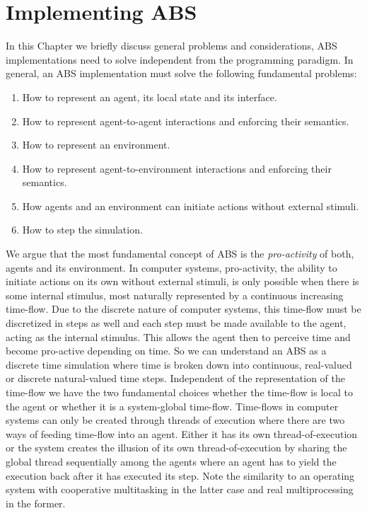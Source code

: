 \chapter{Implementing ABS}
\label{ch:impl_abs}
In this Chapter we briefly discuss general problems and considerations, ABS implementations need to solve independent from the programming paradigm. In general, an ABS implementation must solve the following fundamental problems:

\begin{enumerate}
	\item How to represent an agent, its local state and its interface.
	\item How to represent agent-to-agent interactions and enforcing their semantics.
	\item How to represent an environment.
	\item How to represent agent-to-environment interactions and enforcing their semantics.
	\item How agents and an environment can initiate actions without external stimuli.
	\item How to step the simulation.
\end{enumerate}

We argue that the most fundamental concept of ABS is the \textit{pro-activity} of both, agents and its environment. In computer systems, pro-activity, the ability to initiate actions on its own without external stimuli, is only possible when there is some internal stimulus, most naturally represented by a continuous increasing time-flow. Due to the discrete nature of computer systems, this time-flow must be discretized in steps as well and each step must be made available to the agent, acting as the internal stimulus. This allows the agent then to perceive time and become pro-active depending on time. So we can understand an ABS as a discrete time simulation where time is broken down into continuous, real-valued or discrete natural-valued time steps. Independent of the representation of the time-flow we have the two fundamental choices whether the time-flow is local to the agent or whether it is a system-global time-flow. Time-flows in computer systems can only be created through threads of execution where there are two ways of feeding time-flow into an agent. Either it has its own thread-of-execution or the system creates the illusion of its own thread-of-execution by sharing the global thread sequentially among the agents where an agent has to yield the execution back after it has executed its step. Note the similarity to an operating system with cooperative multitasking in the latter case and real multiprocessing in the former.


